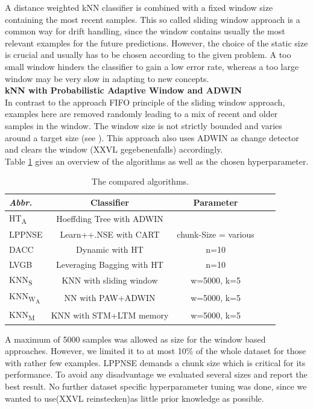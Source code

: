 \documentclass[conference]{IEEEtran}
\begin{document}
A distance weighted kNN classifier is combined with a fixed window size containing the most recent samples. 
This so called sliding window approach is a common way for drift handling, since the window contains usually the most relevant examples
for the future predictions. However, the choice of the static size is crucial and usually has to be chosen according to the given problem. A too small window hinders the classifier to gain a low error rate,
whereas a too large window may be very slow in adapting to new concepts. 
\\\textbf{kNN with Probabilistic Adaptive Window and ADWIN}\\
In contrast to the approach FIFO principle of the sliding window approach, examples here are removed randomly leading to a mix of recent and older samples in the window. The window size is not strictly bounded 
and varies around a target size (see \cite{Bifet:2013:EDS:2480362.2480516}). This approach also uses ADWIN as change detector and clears the window (XXVL gegebenenfalls) accordingly. \\
Table \ref{tab:algorithms} gives an overview of the algorithms as well as the chosen hyperparameter. 
\begin{table}
\def\arraystretch{0.9}
\footnotesize
\centering
\caption{The compared algorithms.}
\label{tab:algorithms}
\begin{tabular}{l|cccc}
\textit{Abbr.} & Classifier & Parameter\\\hline
HT\textsubscript{A} & Hoeffding Tree with ADWIN \\
LPPNSE & Learn++.NSE with CART& chunk-Size = various\\
DACC & Dynamic with HT& n=10\\
LVGB & Leveraging Bagging with HT& n=10\\
KNN\textsubscript{S} & KNN with sliding window & w=5000, k=5\\
KNN\textsubscript{W\textsubscript{A}} & NN with PAW+ADWIN& w=5000, k=5\\
KNN\textsubscript{M} &KNN with STM+LTM memory & w=5000, k=5\\
\end{tabular}
\end{table}
A maximum of 5000 samples was allowed as size for the window based approaches. However,
we limited it to at most 10\% of the whole dataset for those with rather few examples. LPPNSE demands a chunk size which is critical for its performance. To avoid any disadvantage 
we evaluated several sizes and report the best result. No further dataset specific hyperparameter tuning was done, since we wanted to use(XXVL reinstecken)as little prior knowledge as possible.
\end{document}
